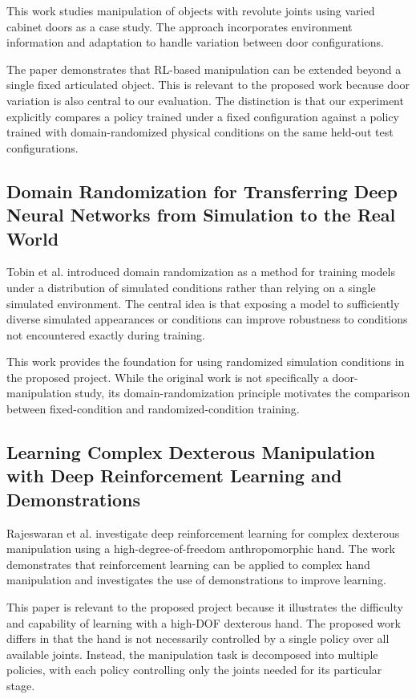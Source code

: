 \documentclass[12pt,a4paper]{report}
\begin{document}
This work studies manipulation of objects with revolute joints using varied cabinet doors as a case study. The approach incorporates environment information and adaptation to handle variation between door configurations.

The paper demonstrates that RL-based manipulation can be extended beyond a single fixed articulated object. This is relevant to the proposed work because door variation is also central to our evaluation. The distinction is that our experiment explicitly compares a policy trained under a fixed configuration against a policy trained with domain-randomized physical conditions on the same held-out test configurations.

\subsection{Domain Randomization for Transferring Deep Neural Networks from Simulation to the Real World}

Tobin et al. introduced domain randomization as a method for training models under a distribution of simulated conditions rather than relying on a single simulated environment. The central idea is that exposing a model to sufficiently diverse simulated appearances or conditions can improve robustness to conditions not encountered exactly during training.

This work provides the foundation for using randomized simulation conditions in the proposed project. While the original work is not specifically a door-manipulation study, its domain-randomization principle motivates the comparison between fixed-condition and randomized-condition training.

\subsection{Learning Complex Dexterous Manipulation with Deep Reinforcement Learning and Demonstrations}

Rajeswaran et al. investigate deep reinforcement learning for complex dexterous manipulation using a high-degree-of-freedom anthropomorphic hand. The work demonstrates that reinforcement learning can be applied to complex hand manipulation and investigates the use of demonstrations to improve learning.

This paper is relevant to the proposed project because it illustrates the difficulty and capability of learning with a high-DOF dexterous hand. The proposed work differs in that the hand is not necessarily controlled by a single policy over all available joints. Instead, the manipulation task is decomposed into multiple policies, with each policy controlling only the joints needed for its particular stage.
\end{document}
